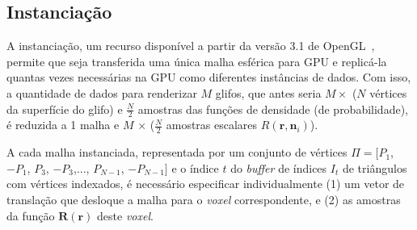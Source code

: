 



\subsection{Instanciação}
\label{ssec::atributos}

A instanciação, um recurso disponível a partir da versão 3.1 de OpenGL~\cite{segal2009}, permite que seja transferida uma única malha esférica para GPU e replicá-la quantas vezes necessárias na GPU como diferentes instâncias de dados. Com isso, a quantidade de dados para renderizar $M$ glifos, que antes seria $M \times$ ($N$ vértices da superfície do glifo) e $\frac{N}{2}$ amostras das funções de densidade (de probabilidade), é reduzida a 1 malha e $M$ $\times$ ($\frac{N}{2}$ amostras escalares $R(\mathbf{r}, \mathbf{n}_i)$).

A cada malha instanciada, representada por um conjunto de vértices $\Pi = [
  P_1$,
$-P_1$,
$ P_3$,
$-P_3$,...,
$ P_{N-1}$,
$-P_{N-1}]$ e o índice $t$ do \textit{buffer} de índices $I_t$ de triângulos com vértices indexados, é necessário especificar individualmente (1) um vetor de translação que desloque a malha para o \textit{voxel} correspondente, e (2) as amostras da função $\boldsymbol{R}(\mathbf{r})$ deste \textit{voxel}.


